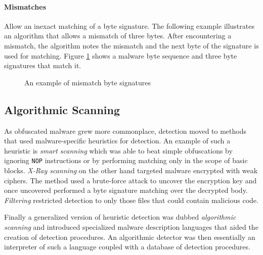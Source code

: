 \paragraph*{Mismatches} Allow an inexact matching of a byte signature. The following example illustrates an algorithm that allows a mismatch of three bytes. After encountering a mismatch, the algorithm notes the mismatch and the next byte of the signature is used for matching. Figure \ref{fig_mismatch} shows a malware byte sequence and three byte signatures that match it.

\begin{figure}[H]
    \centering
    \caption{An example of mismatch byte signatures}
    \label{fig_mismatch}
\end{figure}

\subsection{Algorithmic Scanning}
As obfuscated malware grew more commonplace, detection moved to methods that used malware-specific heuristics for detection. An example of such a heuristic is \emph{smart scanning} which was able to beat simple obfuscations by ignoring \texttt{NOP} instructions or by performing matching only in the scope of basic blocks. \emph{X-Ray scanning} on the other hand targeted malware encrypted with weak ciphers. The method used a brute-force attack to uncover the encryption key and once uncovered performed a byte signature matching over the decrypted body. \emph{Filtering} restricted detection to only those files that could contain malicious code.

Finally a generalized version of heuristic detection was dubbed \emph{algorithmic scanning} and introduced specialized malware description languages that aided the creation of detection procedures. An algorithmic detector was then essentially an interpreter of such a language coupled with a database of detection procedures.

